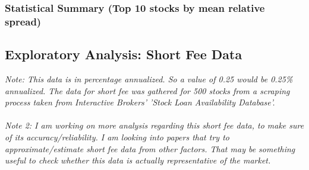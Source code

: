\documentclass[11pt, letterpaper]{article}
\begin{document}
\subsubsection*{Statistical Summary (Top 10 stocks by mean relative spread)}
\begin{table}[h!]
\centering
{}
\caption{Relative Spread Statistics for Top 10 Stocks by Mean.}
\end{table}




\clearpage

\subsection{Exploratory Analysis: Short Fee Data}
\textit{Note: This data is in percentage annualized. So a value of 0.25 would be 0.25\% annualized. The data for short fee was gathered for 500 stocks from a scraping process taken from Interactive Brokers' 'Stock Loan Availability Database'.}
\\
\\
\textit{Note 2: I am working on more analysis regarding this short fee data, to make sure of its accuracy/reliability. I am looking into papers that try to approximate/estimate short fee data from other factors. That may be something useful to check whether this data is actually representative of the market.} 
\end{document}
